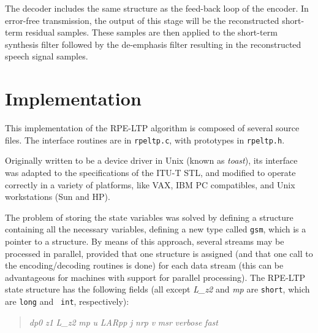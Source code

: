 The decoder includes the same structure as the feed-back loop of the
encoder. In error-free transmission, the output of this stage will be
the reconstructed short-term residual samples. These samples are then
applied to the short-term synthesis filter followed by the de-emphasis
filter resulting in the reconstructed speech signal samples.


\section{Implementation}

This implementation of the RPE-LTP algorithm is composed  of several
source files. The interface routines are in {\tt rpeltp.c},  with
prototypes in {\tt rpeltp.h}.

Originally written to be a device driver in Unix (known as {\em
toast}), its interface was adapted  to the specifications of the ITU-T
STL, and modified to operate correctly in a variety  of platforms,
like VAX, IBM PC compatibles, and Unix workstations (Sun and HP).

The problem of storing the state variables was solved by defining a
structure containing all the necessary variables, defining a new type
called {\tt gsm}, which is a pointer to a structure.  By means of
this approach, several streams may be processed in parallel, provided
that one structure is assigned (and that one call to the
encoding/decoding routines is done) for each data stream (this can be
advantageous for machines with support for parallel processing). The
RPE-LTP state structure has the following fields (all except {\em
L\_z2} and {\em mp}  are {\tt short}, which are {\tt long} and {\tt
int}, respectively):
\begin{quote} \normalsize
 {\em dp0} \hfill {}
 {\em z1} \hfill {}
 {\em L\_z2} \hfill {}
 {\em mp} \hfill {}
 {\em u} \hfill {}
 {\em LARpp}\hfill {}
 {\em j}\hfill {}
 {\em nrp} \hfill {}
 {\em v} \hfill {}
 {\em msr} \hfill {}
 {\em verbose} \hfill {}
 {\em fast} \hfill {}
\end{quote}

